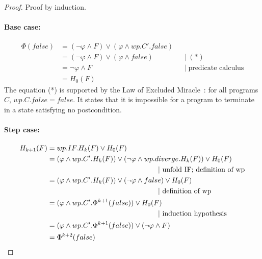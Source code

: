 \begin{proof}
Proof by induction. 
\vspace{-0.25cm}\paragraph{Base case: } 
  \begin{align*} 
    \Phi(false)   & = (\neg\varphi\wedge F)\vee(\varphi\wedge wp.C'.false)  & \\ 
                  & = (\neg\varphi\wedge F)\vee(\varphi\wedge false)         && |\ (*)\\
                  & = \neg\varphi\wedge F                                    && |\ \text{predicate calculus} \\
                  & = H_0(F)
  \end{align*}
The equation (*) is supported by the Law of Excluded Miracle~\cite[p.18]{dijkstra76}: for all programs $C$, $wp.C.false = false$. 
It states that it is impossible for a program to terminate in a state satisfying no postcondition. 

\vspace{-0.25cm}\paragraph{Step case: } 
  \begin{align*} 
    H_{k+1}(F)     & = wp.IF.H_{k}(F) \vee H_0(F) \\
                  & = (\varphi\wedge wp.C'.H_{k}(F))\vee(\neg\varphi\wedge wp.diverge.H_{k}(F)) \vee H_0(F) \\ 
                  &\hspace{0.45\textwidth} | \ \text{unfold IF; definition of wp} \\
                  & = (\varphi\wedge wp.C'.H_{k}(F))\vee(\neg\varphi\wedge false) \vee H_0(F) \\
                  &\hspace{0.45\textwidth} | \ \text{definition of wp} \\
                  & = (\varphi\wedge wp.C'.\Phi^{k+1}(false)) \vee H_0(F)  \\
                  &\hspace{0.45\textwidth} | \ \text{induction hypothesis} \\
                  & = (\varphi\wedge wp.C'.\Phi^{k+1}(false)) \vee (\neg\varphi\wedge F)  \\
                  & = \Phi^{k+2}(false)  \\
  \end{align*}

\end{proof}

